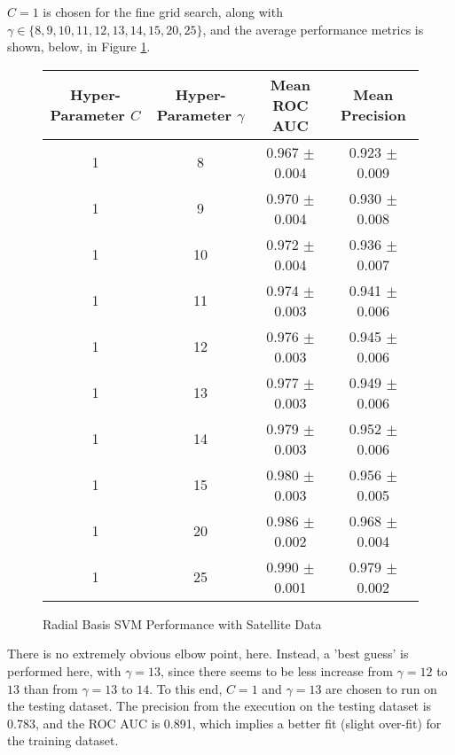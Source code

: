 \documentclass[tikz]{article}
\begin{document}
$C = 1$ is chosen for the fine grid search, along with $\gamma \in \{8, 9, 10, 11, 12, 13, 14, 15, 20, 25\}$, and the average performance metrics is shown, below, in Figure \ref{fig:sat_rbf_2}.

\begin{figure}[H]
\centering
\begin{tabular}{|c|c|c|c|}
\hline
Hyper-Parameter $C$ & Hyper-Parameter $\gamma$ & Mean ROC AUC & Mean Precision \\
\hline
1 & 8 & 0.967 $\pm$ 0.004 & 0.923 $\pm$ 0.009 \\
\hline
1 & 9 & 0.970 $\pm$ 0.004 & 0.930 $\pm$ 0.008 \\
\hline
1 & 10 & 0.972 $\pm$ 0.004 & 0.936 $\pm$ 0.007 \\
\hline
1 & 11 & 0.974 $\pm$ 0.003 & 0.941 $\pm$ 0.006 \\
\hline
1 & 12 & 0.976 $\pm$ 0.003 & 0.945 $\pm$ 0.006 \\
\hline
1 & 13 & 0.977 $\pm$ 0.003 & 0.949 $\pm$ 0.006 \\
\hline
1 & 14 & 0.979 $\pm$ 0.003 & 0.952 $\pm$ 0.006 \\
\hline
1 & 15 & 0.980 $\pm$ 0.003 & 0.956 $\pm$ 0.005 \\
\hline
1 & 20 & 0.986 $\pm$ 0.002 & 0.968 $\pm$ 0.004 \\
\hline
1 & 25 & 0.990 $\pm$ 0.001 & 0.979 $\pm$ 0.002 \\
\hline
\end{tabular}
\caption{Radial Basis SVM Performance with Satellite Data}
\label{fig:sat_rbf_2}
\end{figure}

There is no extremely obvious elbow point, here. Instead, a 'best guess' is performed here, with $\gamma = 13$, since there seems to be less increase from $\gamma = 12$ to $13$ than from $\gamma = 13$ to $14$. To this end, $C = 1$ and $\gamma = 13$ are chosen to run on the testing dataset. The precision from the execution on the testing dataset is 0.783, and the ROC AUC is 0.891, which implies a better fit (slight over-fit) for the training dataset.
\end{document}
